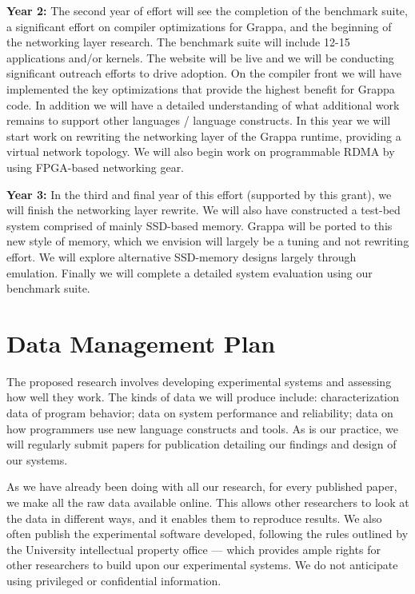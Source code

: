 \vspace{1ex}
\noindent\textbf{Year 2:} The second year of effort will see the completion of the benchmark suite, a significant effort on compiler optimizations for Grappa, and the beginning of the networking layer research.  The benchmark suite will include 12-15 applications and/or kernels.  The website will be live and we will be conducting significant outreach efforts to drive adoption.  On the compiler front we will have implemented the key optimizations that provide the highest benefit for Grappa code.  In addition we will have a detailed understanding of what additional work remains to support other languages / language constructs.  In this year we will start work on rewriting the networking layer of the Grappa runtime, providing a virtual network topology.  We will also begin work on programmable RDMA by using FPGA-based networking gear.


\vspace{1ex}
\noindent\textbf{Year 3:} In the third and final year of this effort (supported by this grant), we will finish the networking layer rewrite.  We will also have constructed a test-bed system comprised of mainly SSD-based memory.  Grappa will be ported to this new style of memory, which we envision will largely be a tuning and not rewriting effort.  We will explore alternative SSD-memory designs largely through emulation.  Finally we will complete a detailed system evaluation using our benchmark suite.

\newpage

\section*{Data Management Plan}

The proposed research involves developing experimental systems and
assessing how well they work. The kinds of data we will produce
include: characterization data of program behavior; data on system
performance and reliability; data on how programmers use new language
constructs and tools. As is our practice, we will regularly submit
papers for publication detailing our findings and design of our
systems.

As we have already been doing with all our research, for every
published paper, we make all the raw data available online. This
allows other researchers to look at the data in different ways, and it
enables them to reproduce results. We also often publish
the experimental software developed, following the rules outlined by
the University intellectual property office --- which provides ample
rights for other researchers to build upon our experimental
systems. We do not anticipate using privileged or confidential
information. 

